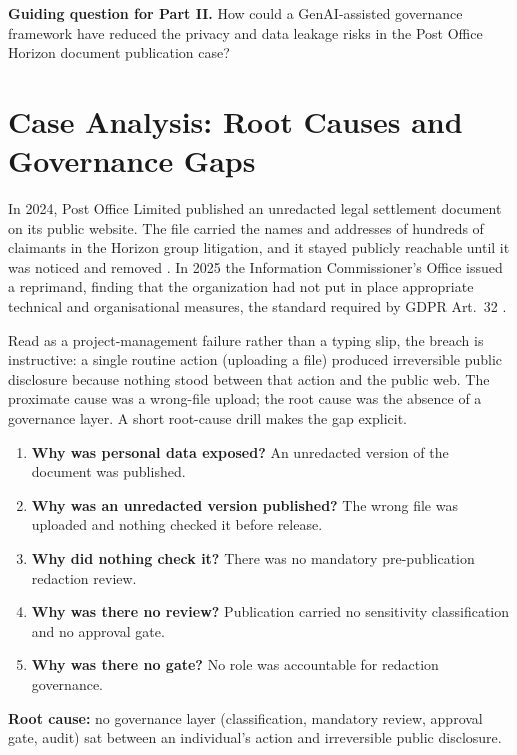 \documentclass[12pt,a4paper]{article}
\begin{document}
\begin{quotebox}
\textbf{Guiding question for Part II.} How could a GenAI-assisted governance framework have reduced the privacy and data leakage risks in the Post Office Horizon document publication case?
\end{quotebox}

\section{Case Analysis: Root Causes and Governance Gaps}
\label{sec:case_analysis}

In 2024, Post Office Limited published an unredacted legal settlement document on its public website. The file carried the names and addresses of hundreds of claimants in the Horizon group litigation, and it stayed publicly reachable until it was noticed and removed \cite{guardian2024}. In 2025 the Information Commissioner's Office issued a reprimand, finding that the organization had not put in place appropriate technical and organisational measures, the standard required by GDPR Art.~32 \cite{ico2025}.

Read as a project-management failure rather than a typing slip, the breach is instructive: a single routine action (uploading a file) produced irreversible public disclosure because nothing stood between that action and the public web. The proximate cause was a wrong-file upload; the root cause was the absence of a governance layer. A short root-cause drill makes the gap explicit.

\begin{definitionbox}
\begin{enumerate}
  \item \textbf{Why was personal data exposed?} An unredacted version of the document was published.
  \item \textbf{Why was an unredacted version published?} The wrong file was uploaded and nothing checked it before release.
  \item \textbf{Why did nothing check it?} There was no mandatory pre-publication redaction review.
  \item \textbf{Why was there no review?} Publication carried no sensitivity classification and no approval gate.
  \item \textbf{Why was there no gate?} No role was accountable for redaction governance.
\end{enumerate}
\textbf{Root cause:} no governance layer (classification, mandatory review, approval gate, audit) sat between an individual's action and irreversible public disclosure.
\end{definitionbox}
\end{document}
